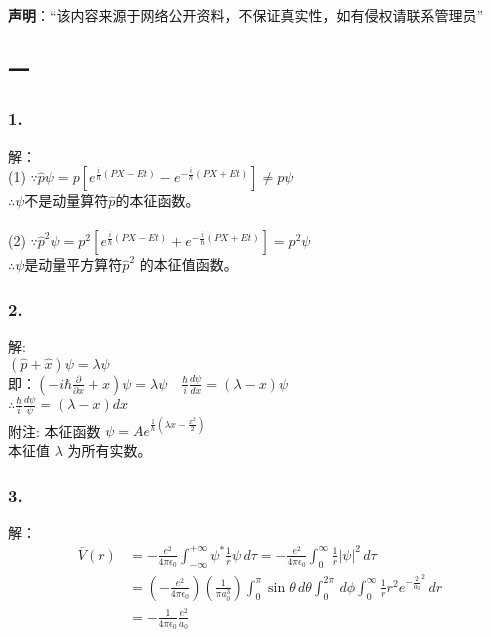 
\textbf{声明}：“该内容来源于网络公开资料，不保证真实性，如有侵权请联系管理员”


\subsection{一}
\subsubsection{1.} 
解：\\
(1) $\because \hat{p} \psi = p\left[e^{\frac{i}{\hbar}(PX - Et)} - e^{-\frac{i}{\hbar}(PX + Et)}\right] \neq p\psi$\\
 $\therefore \psi$不是动量算符$\hat{p}$的本征函数。\\\\
(2) $\because \hat{p}^2 \psi = p^2\left[e^{\frac{i}{\hbar}(PX - Et)} + e^{-\frac{i}{\hbar}(PX + Et)}\right] = p^2\psi$ \\
$\therefore \psi$是动量平方算符$\hat{p}^2$ 的本征值函数。 
\subsubsection{2.}解:\\
$(\hat{p} + \hat{x})\psi = \lambda \psi$\\
即：$(-i\hbar\frac{\partial}{\partial x} + x)\psi = \lambda \psi \quad \frac{\hbar}{i} \frac{d\psi}{dx} = (\lambda - x)\psi$ \\
$\therefore \frac{\hbar}{i} \frac{d\psi}{\psi} = (\lambda - x)dx$\\
附注: 本征函数 $\psi = Ae^{\frac{1}{\hbar}(\lambda x - \frac{x^2}{2})}$ \\
      本征值 $\lambda$ 为所有实数。
\subsubsection{3.}
解：
\begin{align}
\overline{V}(r) &= -\frac{e^2}{4 \pi \epsilon_0} \int_{-\infty}^{+\infty} \psi^* \frac{1}{r} \psi \, d\tau 
= -\frac{e^2}{4 \pi \epsilon_0} \int_0^\infty \frac{1}{r} |\psi|^2 \, d\tau\\
&= \left( -\frac{e^2}{4 \pi \epsilon_0} \right) \left( \frac{1}{\pi a_0^3} \right) \int_0^\pi \sin \theta \, d\theta \int_0^{2\pi} \, d\phi \int_0^\infty \frac{1}{r} r^2 e^{-\frac{2}{a_0}^2} \, dr\\
&= -\frac{1}{4 \pi \epsilon_0} \frac{e^2}{a_0}~
\end{align}
